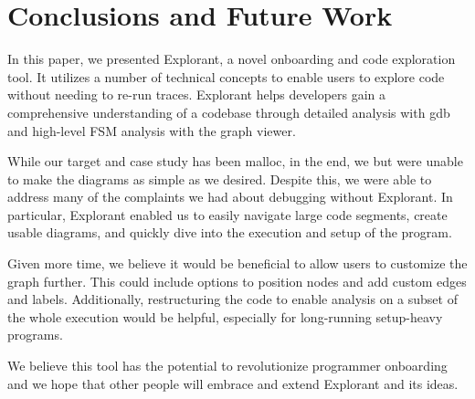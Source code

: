 \chapter{Conclusions and Future Work}
In this paper, we presented Explorant, a novel onboarding and code exploration tool. It utilizes a number of technical concepts to enable users to explore code without needing to re-run traces. Explorant helps developers gain a comprehensive understanding of a codebase through detailed analysis with gdb and high-level FSM analysis with the graph viewer. 

While our target and case study has been malloc, in the end, we but were unable to make the diagrams as simple as we desired. Despite this, we were able to address many of the complaints we had about debugging without Explorant. In particular, Explorant enabled us to easily navigate large code segments, create usable diagrams, and quickly dive into the execution and setup of the program. 

Given more time, we believe it would be beneficial to allow users to customize the graph further. This could include options to position nodes and add custom edges and labels. Additionally, restructuring the code to enable analysis on a subset of the whole execution would be helpful, especially for long-running setup-heavy programs. 

We believe this tool has the potential to revolutionize programmer onboarding and we hope that other people will embrace and extend Explorant and its ideas.
